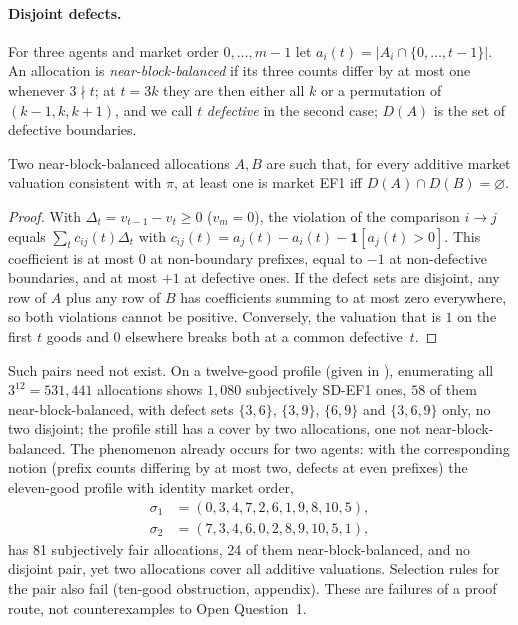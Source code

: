\documentclass[sigconf,anonymous]{aamas}
\begin{document}
\paragraph{Disjoint defects.}
For three agents and market order $0,\dots,m-1$ let $a_i(t)=|A_i\cap\{0,\dots,t-1\}|$. An allocation is \emph{near-block-balanced} if its three counts differ by at most one whenever $3\nmid t$; at $t=3k$ they are then either all $k$ or a permutation of $(k-1,k,k+1)$, and we call $t$ \emph{defective} in the second case; $D(A)$ is the set of defective boundaries.
\begin{proposition}\label{prop:defect}
Two near-block-balanced allocations $A,B$ are such that, for every additive market valuation consistent with $\pi$, at least one is market EF1 iff $D(A)\cap D(B)=\varnothing$.
\end{proposition}
\begin{proof}
With $\Delta_t=v_{t-1}-v_t\ge0$ ($v_m=0$), the violation of the comparison $i\to j$ equals $\sum_t c_{ij}(t)\Delta_t$ with $c_{ij}(t)=a_j(t)-a_i(t)-\mathbf 1[a_j(t)>0]$. This coefficient is at most $0$ at non-boundary prefixes, equal to $-1$ at non-defective boundaries, and at most $+1$ at defective ones. If the defect sets are disjoint, any row of $A$ plus any row of $B$ has coefficients summing to at most zero everywhere, so both violations cannot be positive. Conversely, the valuation that is $1$ on the first $t$ goods and $0$ elsewhere breaks both at a common defective~$t$.
\end{proof}
Such pairs need not exist. On a twelve-good profile (given in \appDefect), enumerating all $3^{12}=531{,}441$ allocations shows $1{,}080$ subjectively SD-EF1 ones, $58$ of them near-block-balanced, with defect sets $\{3,6\}$, $\{3,9\}$, $\{6,9\}$ and $\{3,6,9\}$ only, no two disjoint; the profile still has a cover by two allocations, one not near-block-balanced. The phenomenon already occurs for two agents: with the corresponding notion (prefix counts differing by at most two, defects at even prefixes) the eleven-good profile with identity market order,
\begin{align*}
\sigma_1&=(0,3,4,7,2,6,1,9,8,10,5),\\
\sigma_2&=(7,3,4,6,0,2,8,9,10,5,1),
\end{align*}
has 81 subjectively fair allocations, 24 of them near-block-balanced, and no disjoint pair, yet two allocations cover all additive valuations. Selection rules for the pair also fail (ten-good obstruction, appendix). These are failures of a proof route, not counterexamples to Open Question~1.
\end{document}

